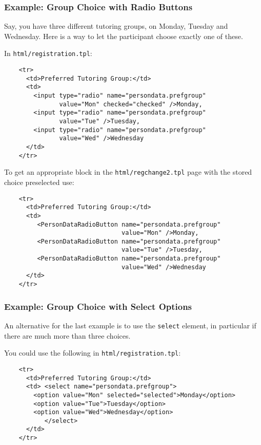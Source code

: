 \documentclass[12pt,openany,a4paper]{book}
\begin{document}
\subsubsection*{Example: Group Choice with Radio Buttons}

Say, you have three different tutoring groups, on Monday, Tuesday and
Wednesday. Here is a way to let the participant choose exactly one of these.

In \texttt{html/registration.tpl}:

\begin{verbatim}
    <tr>
      <td>Preferred Tutoring Group:</td>
      <td>
        <input type="radio" name="persondata.prefgroup" 
               value="Mon" checked="checked" />Monday,
        <input type="radio" name="persondata.prefgroup" 
               value="Tue" />Tuesday,
        <input type="radio" name="persondata.prefgroup" 
               value="Wed" />Wednesday
      </td>
    </tr>
\end{verbatim}

To get an appropriate block in the \texttt{html/regchange2.tpl} page with
the stored choice preselected use:

\begin{verbatim}
    <tr>
      <td>Preferred Tutoring Group:</td>
      <td>
         <PersonDataRadioButton name="persondata.prefgroup" 
                                value="Mon" />Monday,
         <PersonDataRadioButton name="persondata.prefgroup" 
                                value="Tue" />Tuesday,
         <PersonDataRadioButton name="persondata.prefgroup" 
                                value="Wed" />Wednesday
      </td>
    </tr>
\end{verbatim}

\subsubsection*{Example: Group Choice with Select Options}

An alternative for the last example is to use the \texttt{select} element,
in particular if there are much more than three choices.

You could use the following in \texttt{html/registration.tpl}:

\begin{verbatim}
    <tr>
      <td>Preferred Tutoring Group:</td>
      <td> <select name="persondata.prefgroup">
        <option value="Mon" selected="selected">Monday</option>
        <option value="Tue">Tuesday</option>
        <option value="Wed">Wednesday</option>
           </select>
      </td>
    </tr>
\end{verbatim}
\end{document}
